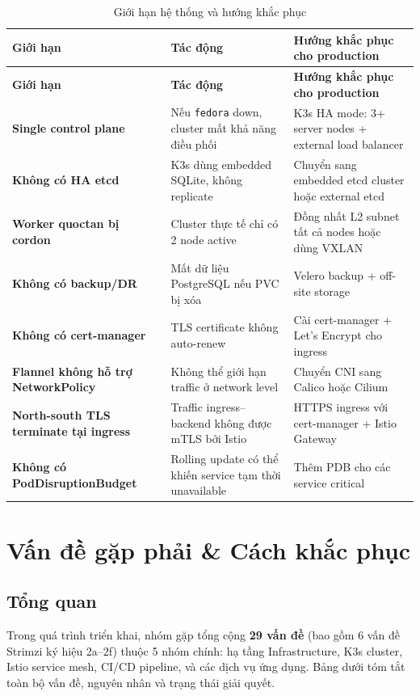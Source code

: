 \renewcommand{\arraystretch}{1.4}
\begin{longtable}{|p{4.5cm}|p{5.5cm}|p{5.5cm}|}
\caption{Giới hạn hệ thống và hướng khắc phục}
\label{tab:limitations} \\
\hline
\textbf{Giới hạn} & \textbf{Tác động} & \textbf{Hướng khắc phục cho production} \\
\hline
\endfirsthead
\hline
\textbf{Giới hạn} & \textbf{Tác động} & \textbf{Hướng khắc phục cho production} \\
\hline
\endhead
\hline
\endfoot
\hline
\endlastfoot
\textbf{Single control plane} & Nếu \texttt{fedora} down, cluster mất khả năng điều phối & K3s HA mode: 3+ server nodes + external load balancer \\
\hline
\textbf{Không có HA etcd} & K3s dùng embedded SQLite, không replicate & Chuyển sang embedded etcd cluster hoặc external etcd \\
\hline
\textbf{Worker quoctan bị cordon} & Cluster thực tế chỉ có 2 node active & Đồng nhất L2 subnet tất cả nodes hoặc dùng VXLAN \\
\hline
\textbf{Không có backup/DR} & Mất dữ liệu PostgreSQL nếu PVC bị xóa & Velero backup + off-site storage \\
\hline
\textbf{Không có cert-manager} & TLS certificate không auto-renew & Cài cert-manager + Let's Encrypt cho ingress \\
\hline
\textbf{Flannel không hỗ trợ NetworkPolicy} & Không thể giới hạn traffic ở network level & Chuyển CNI sang Calico hoặc Cilium \\
\hline
\textbf{North-south TLS terminate tại ingress} & Traffic ingress--backend không được mTLS bởi Istio & HTTPS ingress với cert-manager + Istio Gateway \\
\hline
\textbf{Không có PodDisruptionBudget} & Rolling update có thể khiến service tạm thời unavailable & Thêm PDB cho các service critical \\
\hline
\end{longtable}

\section{Vấn đề gặp phải \& Cách khắc phục}

\subsection{Tổng quan}

Trong quá trình triển khai, nhóm gặp tổng cộng \textbf{29 vấn đề} (bao gồm 6 vấn đề Strimzi ký hiệu 2a--2f) thuộc 5 nhóm chính: hạ tầng Infrastructure, K3s cluster, Istio service mesh, CI/CD pipeline, và các dịch vụ ứng dụng. Bảng dưới tóm tắt toàn bộ vấn đề, nguyên nhân và trạng thái giải quyết.

